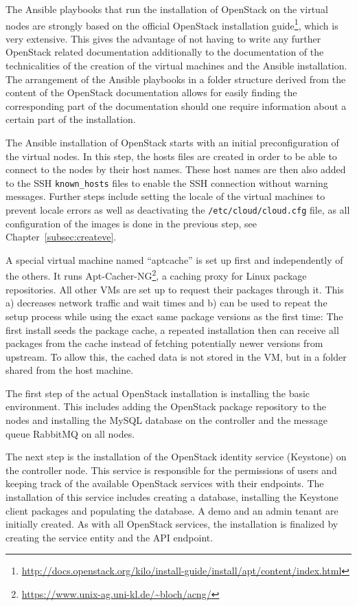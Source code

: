 \documentclass[conference]{IEEEtran}
\begin{document}
The Ansible playbooks that run the installation of OpenStack on the virtual nodes are strongly based on the official OpenStack installation guide\footnote{\url{http://docs.openstack.org/kilo/install-guide/install/apt/content/index.html}}, which is very extensive. This gives the advantage of not having to write any further OpenStack related documentation additionally to the documentation of the technicalities of the creation of the virtual machines and the Ansible installation. The arrangement of the Ansible playbooks in a folder structure derived from the content of the OpenStack documentation allows for easily finding the corresponding part of the documentation should one require information about a certain part of the installation.

The Ansible installation of OpenStack starts with an initial preconfiguration of the virtual nodes. In this step, the hosts files are created in order to be able to connect to the nodes by their host names. These host names are then also added to the SSH \verb|known_hosts| files to enable the SSH connection without warning messages. Further steps include setting the locale of the virtual machines to prevent locale errors as well as deactivating the \verb|/etc/cloud/cloud.cfg| file, as all configuration of the images is done in the previous step, see Chapter~\ref{subsec:createve}.

A special virtual machine named ``aptcache'' is set up first and independently of the others. It runs Apt-Cacher-NG\footnote{\url{https://www.unix-ag.uni-kl.de/~bloch/acng/}}, a caching proxy for Linux package repositories. All other VMs are set up to request their packages through it. This a) decreases network traffic and wait times and b) can be used to repeat the setup process while using the exact same package versions as the first time: The first install seeds the package cache, a repeated installation then can receive all packages from the cache instead of fetching potentially newer versions from upstream. To allow this, the cached data is not stored in the VM, but in a folder shared from the host machine.

The first step of the actual OpenStack installation is installing the basic environment. This includes adding the OpenStack package repository to the nodes and installing the MySQL database on the controller and the message queue RabbitMQ on all nodes.

The next step is the installation of the OpenStack identity service (Keystone) on the controller node. This service is responsible for the permissions of users and keeping track of the available OpenStack services with their endpoints. The installation of this service includes creating a database, installing the Keystone client packages and populating the database. A demo and an admin tenant are initially created. As with all OpenStack services, the installation is finalized by creating the service entity and the API endpoint.
\end{document}
